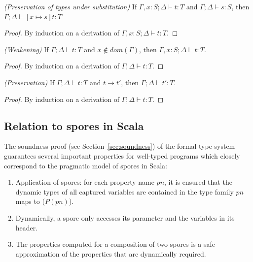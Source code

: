 \documentclass{llncs}
\begin{document}
\begin{lemma}
\emph{(Preservation of types under substitution)}
\label{lem:substitution}
If $\Gamma, x : S ; \Delta \vdash t : T$ and $\Gamma ; \Delta \vdash s : S$, then $\Gamma ; \Delta \vdash [x \mapsto s]t : T$
\end{lemma}
\begin{proof}
By induction on a derivation of $\Gamma, x : S ; \Delta \vdash t : T$.
\end{proof}


\begin{lemma}
\emph{(Weakening)}
\label{lem:weak}
If $\Gamma ; \Delta \vdash t : T$ and $x \notin dom(\Gamma)$, then $\Gamma, x : S ; \Delta \vdash t : T$.
\end{lemma}
\begin{proof}
By induction on a derivation of $\Gamma ; \Delta \vdash t : T$.
\end{proof}


\begin{theorem}
\emph{(Preservation)}
\label{th:pres}
If $\Gamma ; \Delta \vdash t : T$ and $t \rightarrow t'$, then $\Gamma ; \Delta \vdash t' : T$.
\end{theorem}
\begin{proof}
By induction on a derivation of $\Gamma ; \Delta \vdash t : T$.
\end{proof}


\subsection{Relation to spores in Scala}

The soundness proof (see Section~\ref{sec:soundness}) of the formal type system guarantees several important properties for well-typed programs which closely correspond to the pragmatic model of spores in Scala:

\begin{enumerate}

\item Application of spores: for each property name $pn$, it is ensured that the dynamic types of all captured variables are contained in the type family $pn$ maps to ($P(pn)$).

\item Dynamically, a spore only accesses its parameter and the variables in its header.

\item The properties computed for a composition of two spores is a safe approximation of the properties that are dynamically required.

\end{enumerate}
\end{document}
